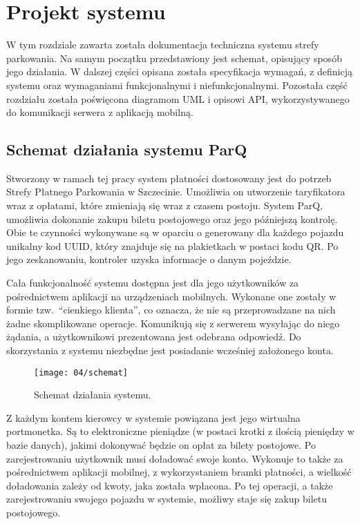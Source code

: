 \setcounter{listing}{0}

\section{Projekt systemu}
W tym rozdziale zawarta została dokumentacja techniczna systemu strefy parkowania. Na samym początku przedstawiony jest schemat, opisujący sposób jego działania. W dalszej części opisana została specyfikacja wymagań, z definicją systemu oraz wymaganiami funkcjonalnymi i niefunkcjonalnymi. Pozostała część rozdziału została poświęcona diagramom UML i opisowi API, wykorzystywanego do komunikacji serwera z aplikacją mobilną. 

\subsection{Schemat działania systemu ParQ}

Stworzony w ramach tej pracy system płatności dostosowany jest do potrzeb Strefy Płatnego Parkowania w Szczecinie. Umożliwia on utworzenie taryfikatora wraz z opłatami, które zmieniają się wraz z czasem postoju. System ParQ, umożliwia dokonanie zakupu biletu postojowego oraz jego późniejszą kontrolę. Obie te czynności wykonywane są w oparciu o generowany dla każdego pojazdu unikalny kod UUID, który znajduje się na plakietkach w postaci kodu QR. Po jego zeskanowaniu, kontroler uzyska informacje o danym pojeździe.

Cała funkcjonalność systemu dostępna jest dla jego użytkowników za pośrednictwem aplikacji na urządzeniach mobilnych. Wykonane one zostały w formie tzw.~``cienkiego klienta'', co oznacza, że nie są przeprowadzane na nich żadne skomplikowane operacje. Komunikują się z serwerem wysyłając do niego żądania, a użytkownikowi prezentowana jest odebrana odpowiedź. Do skorzystania z systemu niezbędne jest posiadanie wcześniej założonego konta.

\begin{figure}[h]
	\begin{center}
		\texttt{[image: 04/schemat]}
	\end{center}
	\caption{Schemat działania systemu.}
\end{figure}

Z każdym kontem kierowcy w systemie powiązana jest jego wirtualna portmonetka. Są to elektroniczne pieniądze (w postaci krotki z ilością pieniędzy w bazie danych), jakimi dokonywać będzie on opłat za bilety postojowe. Po zarejestrowaniu użytkownik musi doładować swoje konto. Wykonuje to także za pośrednictwem aplikacji mobilnej, z wykorzystaniem bramki płatności, a wielkość doładowania zależy od kwoty, jaka została wpłacona. Po tej operacji, a także zarejestrowaniu swojego pojazdu w systemie, możliwy staje się zakup biletu postojowego.

